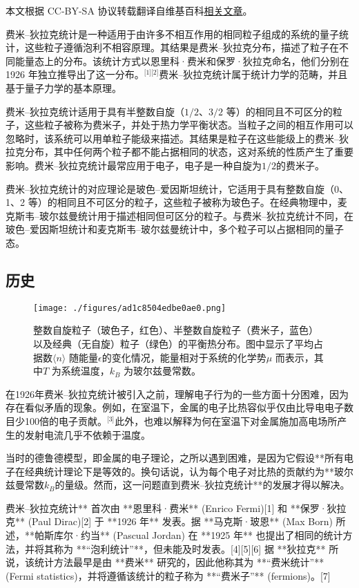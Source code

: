 
本文根据 CC-BY-SA 协议转载翻译自维基百科\href{https://en.wikipedia.org/wiki/Fermi\%E2\%80\%93Dirac_statistics}{相关文章}。

费米–狄拉克统计是一种适用于由许多不相互作用的相同粒子组成的系统的量子统计，这些粒子遵循泡利不相容原理。其结果是费米–狄拉克分布，描述了粒子在不同能量态上的分布。该统计方式以恩里科·费米和保罗·狄拉克命名，他们分别在 1926 年独立推导出了这一分布。\(^\text{[1][2]}\)费米–狄拉克统计属于统计力学的范畴，并且基于量子力学的基本原理。

费米–狄拉克统计适用于具有半整数自旋（\(1/2\)、\(3/2\) 等）的相同且不可区分的粒子，这些粒子被称为费米子，并处于热力学平衡状态。当粒子之间的相互作用可以忽略时，该系统可以用单粒子能级来描述。其结果是粒子在这些能级上的费米–狄拉克分布，其中任何两个粒子都不能占据相同的状态，这对系统的性质产生了重要影响。费米–狄拉克统计最常应用于电子，电子是一种自旋为\(1/2\)的费米子。

费米–狄拉克统计的对应理论是玻色–爱因斯坦统计，它适用于具有整数自旋（0、1、2 等）的相同且不可区分的粒子，这些粒子被称为玻色子。在经典物理中，麦克斯韦–玻尔兹曼统计用于描述相同但可区分的粒子。与费米–狄拉克统计不同，在玻色–爱因斯坦统计和麦克斯韦–玻尔兹曼统计中，多个粒子可以占据相同的量子态。
\subsection{历史}
\begin{figure}[ht]
\centering
\texttt{[image: ./figures/ad1c8504edbe0ae0.png]}
\caption{整数自旋粒子（玻色子，红色）、半整数自旋粒子（费米子，蓝色）以及经典（无自旋）粒子（绿色）的平衡热分布。图中显示了平均占据数\( \langle n \rangle \) 随能量\( \epsilon \)的变化情况，能量相对于系统的化学势\( \mu \) 而表示，其中\( T \) 为系统温度，\( k_B \) 为玻尔兹曼常数。} \label{fig_FermiD_1}
\end{figure}
在1926年费米–狄拉克统计被引入之前，理解电子行为的一些方面十分困难，因为存在看似矛盾的现象。例如，在室温下，金属的电子比热容似乎仅由比导电电子数目少100倍的电子贡献。\(^\text{[3]}\)此外，也难以解释为何在室温下对金属施加高电场所产生的发射电流几乎不依赖于温度。

当时的德鲁德模型，即金属的电子理论，之所以遇到困难，是因为它假设**所有电子在经典统计理论下是等效的。换句话说，认为每个电子对比热的贡献约为**玻尔兹曼常数\( k_B \)的量级。然而，这一问题直到费米–狄拉克统计**的发展才得以解决。  

费米–狄拉克统计** 首次由 **恩里科·费米** (Enrico Fermi)[1] 和 **保罗·狄拉克** (Paul Dirac)[2] 于 **1926 年** 发表。据 **马克斯·玻恩** (Max Born) 所述，**帕斯库尔·约当** (Pascual Jordan) 在 **1925 年** 也提出了相同的统计方法，并将其称为 **“泡利统计”**，但未能及时发表。[4][5][6] 据 **狄拉克** 所说，该统计方法最早是由 **费米** 研究的，因此他称其为 **“费米统计”** (Fermi statistics)，并将遵循该统计的粒子称为 **“费米子”** (fermions)。[7]  

